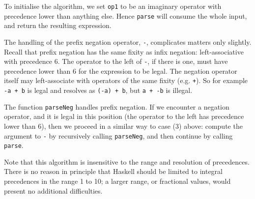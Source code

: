 \begin{haskellprime}
To initialise the algorithm, we set \mbox{\tt op1} to be an imaginary operator
with precedence lower than anything else.  Hence \mbox{\tt parse} will consume
the whole input, and return the resulting expression.

The handling of the prefix negation operator, \mbox{\tt -}, complicates matters
only slightly.  Recall that prefix negation has the same fixity as
infix negation: left-associative with precedence 6.  The operator to
the left of \mbox{\tt -}, if there is one, must have precedence lower than 6
for the expression to be legal.  The negation operator itself may
left-associate with operators of the same fixity (e.g. \mbox{\tt +}).  So for
example \mbox{\tt -a\ +\ b} is legal and resolves as \mbox{\tt (-a)\ +\ b}, but \mbox{\tt a\ +\ -b} is
illegal.

The function \mbox{\tt parseNeg} handles prefix negation.  If we encounter a
negation operator, and it is legal in this position (the operator to
the left has precedence lower than 6), then we proceed in a similar
way to case (3) above: compute the argument to \mbox{\tt -} by recursively
calling \mbox{\tt parseNeg}, and then continue by calling \mbox{\tt parse}.

Note that this algorithm is insensitive to the range and resolution of
precedences.  There is no reason in principle that Haskell should be
limited to integral precedences in the range 1 to 10; a larger range,
or fractional values, would present no additional difficulties.

\end{haskellprime}

